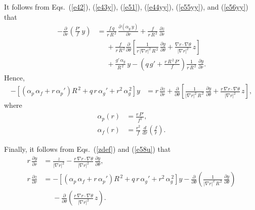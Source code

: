 \documentclass[12pt,prb,aps,notitlepage]{revtex4-1}
\begin{document}
It follows from Eqs.~(\ref{e42}), (\ref{e43y}), (\ref{e51}), (\ref{e44yy}), (\ref{e55yy}), and (\ref{e56yy}) that
\begin{align}
-\frac{\partial}{\partial r}\!\left(\frac{P'}{f}\,y\right)&= \frac{f\,q}{r\,R^{\,2}}\,\frac{\partial (\alpha_g\,y)}{\partial r} 
+ \frac{f}{r\,R^{\,2}}\,\frac{\partial z}{\partial r}\nonumber\\[0.5ex]
&\phantom{=} +\frac{f}{r\,R^{\,2}}\frac{\partial}{\partial\theta}\!\left[\frac{1}{r\,|\nabla r|^2\,R^{\,2}}\,\frac{\partial y}{\partial \theta} + \frac{\nabla r\cdot\nabla\theta}{|\nabla r|^2}\,z\right]
\nonumber\\[0.5ex]
&\phantom{=} + \frac{g'\,\alpha_g}{R^{\,2}}\,y - \left(q\,g'+\frac{r\,R^{\,2}\,P'}{f}\right)\frac{1}{r\,R^{\,2}}\,\frac{\partial y}{\partial r}.
\end{align}
Hence,
\begin{align}\label{e58u}
-\left[(\alpha_p\,\alpha_f+ r\,\alpha_p')R^{\,2} + q\,r\,\alpha_g'+r^2\,\alpha_g^{\,2}\right]y&= 
 r\,\frac{\partial z}{\partial r}+\frac{\partial}{\partial\theta}\!\left[\frac{1}{|\nabla r|^2\,R^{\,2}}\,\frac{\partial y}{\partial \theta} + \frac{r\,\nabla r\cdot\nabla\theta}{|\nabla r|^2}\,z\right],
\end{align}
where
\begin{align}\label{alpp}
\alpha_p(r)&= \frac{r\,P'}{f^2},\\[0.5ex]
\alpha_f(r) &= \frac{r^2}{f}\,\frac{d}{dr}\!\left(\frac{f}{r}\right).
\end{align}

Finally, it follows from Eqs.~(\ref{zdef}) and (\ref{e58u})  that
\begin{align}\label{e63y}
r\,\frac{\partial y}{\partial r} &= \frac{z}{|\nabla r|^2} - \frac{r\,\nabla r\cdot\nabla\theta}{|\nabla r|^2}\,\frac{\partial y}{\partial\theta},\\[0.5ex]
r\,\frac{\partial z}{\partial r}&= -\left[(\alpha_p\,\alpha_f+ r\,\alpha_p')R^{\,2} + q\,r\,\alpha_g'+r^2\,\alpha_g^{\,2}\right]y-\frac{\partial}{\partial\theta}\!\left(\frac{1}{|\nabla r|^2\,R^{\,2}}\,\frac{\partial y}{\partial\theta}\right)\nonumber\\[0.5ex]
&\phantom{=} -\frac{\partial}{\partial\theta}\!\left(\frac{r\,\nabla r\cdot\nabla\theta}{|\nabla r|^2}\,z\right).\label{e64y}
\end{align}
\end{document}

